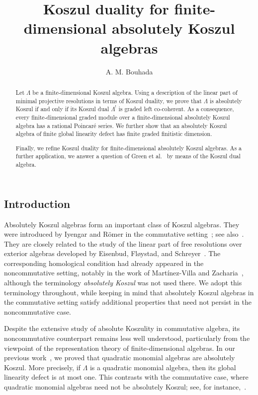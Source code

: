 \documentclass[11pt]{article}
\title{Koszul duality for finite-dimensional absolutely Koszul algebras}
\author{
A. M. Bouhada 
\date{}
}
\theoremstyle{definition}
\theoremstyle{remark}
\begin{document}
\maketitle
\pagestyle{plain}

\begin{abstract}
Let \(\Lambda\) be a finite-dimensional Koszul algebra. Using a description of the linear part of minimal projective resolutions in terms of Koszul duality, we prove that \(\Lambda\) is absolutely Koszul if and only if its Koszul dual \(\Lambda^{!}\) is graded left co-coherent. As a consequence, every finite-dimensional graded module over a finite-dimensional absolutely Koszul algebra has a rational Poincar\'e series.
We further show that an absolutely Koszul algebra of finite global linearity defect has finite graded finitistic dimension.

Finally, we refine Koszul duality for finite-dimensional absolutely Koszul algebras. As a further application, we answer a question of Green et al.~\cite{12} by means of the Koszul dual algebra.
\end{abstract}

\begin{center}
\section{Introduction}
\end{center}

Absolutely Koszul algebras form an important class of Koszul algebras. They were introduced by Iyengar and R\"omer in the commutative setting~\cite{15}; see also~\cite{14}. They are closely related to the study of the linear part of free resolutions over exterior algebras developed by Eisenbud, Fl{\o}ystad, and Schreyer~\cite{11}. The corresponding homological condition had already appeared in the noncommutative setting, notably in the work of Mart\'inez-Villa and Zacharia~\cite{19}, although the terminology \emph{absolutely Koszul} was not used there. We adopt this terminology throughout, while keeping in mind that absolutely Koszul algebras in the commutative setting satisfy additional properties that need not persist in the noncommutative case.

Despite the extensive study of absolute Koszulity in commutative algebra, its noncommutative counterpart remains less well understood, particularly from the viewpoint of the representation theory of finite-dimensional algebras. In our previous work~\cite{5}, we proved that quadratic monomial algebras are absolutely Koszul. More precisely, if \(\Lambda\) is a quadratic monomial algebra, then its global linearity defect is at most one. This contrasts with the commutative case, where quadratic monomial algebras need not be absolutely Koszul; see, for instance,~\cite{10}.
\end{document}
